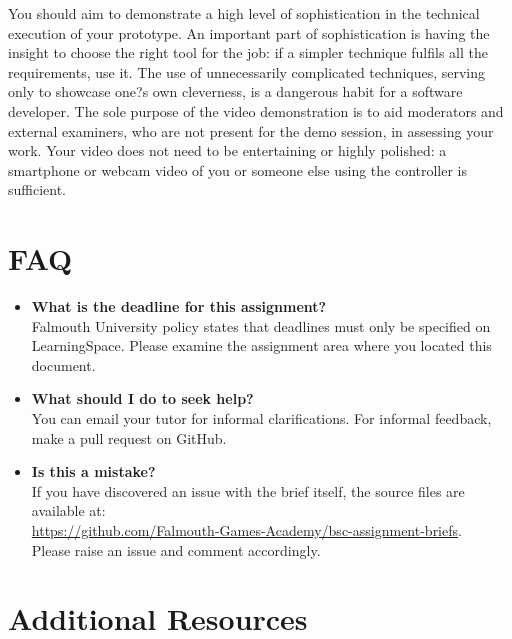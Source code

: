 \documentclass{../fal_assignment}
\begin{document}
You should aim to demonstrate a high level of sophistication in the technical execution of your prototype. An important part of sophistication is having the insight to choose the right tool for the job: if a simpler technique fulfils all the requirements, use it. The use of unnecessarily complicated techniques, serving only to showcase one?s own cleverness, is a dangerous habit for a software developer. 
The sole purpose of the video demonstration is to aid moderators and external examiners, who are not present for the demo session, in assessing your work. Your video does not need to be entertaining or highly polished: a smartphone or webcam video of you or someone else using the controller is sufficient. 

\section*{FAQ}

\begin{itemize}
	\item 	\textbf{What is the deadline for this assignment?} \\ 
    		Falmouth University policy states that deadlines must only be specified on LearningSpace. Please examine the assignment area where you located this document.
    		
	\item 	\textbf{What should I do to seek help?} \\ 
    		You can email your tutor for informal clarifications. For informal feedback, make a pull request on GitHub. 
    		
    	\item 	\textbf{Is this a mistake?} \\ 	
    		If you have discovered an issue with the brief itself, the source files are available at: \\
    		\url{https://github.com/Falmouth-Games-Academy/bsc-assignment-briefs}.\\
    		 Please raise an issue and comment accordingly.
\end{itemize}

\section*{Additional Resources}
\end{document}
